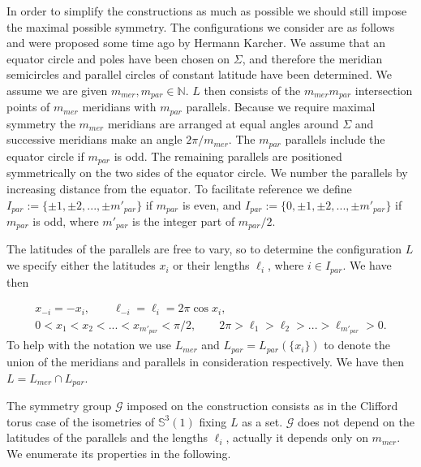 \documentclass[12pt,namelimits,sumlimits]{amsart}
\theoremstyle{remark}
\numberwithin{equation}{section}
\begin{document}
In order to simplify the constructions as much as possible we should still impose the maximal possible symmetry.
The configurations we consider are as follows and were proposed some time ago by Hermann Karcher.
We assume that an equator circle and poles have been chosen on $\Sigma$,
and therefore the meridian semicircles and parallel circles of constant latitude have been determined.
We assume we are given ${{m_{mer}}},{{m_{par}}}\in{\mathbb{N}}$.
$L$ then consists of the ${{m_{mer}}}{{m_{par}}}$ intersection points
of ${{m_{mer}}}$ meridians with ${{m_{par}}}$ parallels.
Because we require maximal symmetry the ${{m_{mer}}}$ meridians are arranged at equal angles around $\Sigma$
and successive meridians make an angle $2\pi/{{m_{mer}}}$.
The ${{m_{par}}}$ parallels include the equator circle if ${{m_{par}}}$ is odd.
The remaining parallels are positioned symmetrically on the two sides of the equator circle.
We number the parallels by increasing distance from the equator.
To facilitate reference we define ${{I_{par}}}:=\{\pm1,\pm2,...,\pm{{m'_{par}}}\}$ if ${{m_{par}}}$ is even,
and ${{I_{par}}}:=\{0,\pm1,\pm2,...,\pm{{m'_{par}}}\}$ if ${{m_{par}}}$ is odd,
where ${{m'_{par}}}$ is the integer part of ${{m_{par}}}/2$.

The latitudes of the parallels are free to vary,
so to determine the configuration $L$ we specify
either the latitudes $x_i$ or their lengths $\ell_i$,
where $i\in{{I_{par}}}$.
We have then
\addtocounter{theorem}{1}
\begin{equation}
\label{Elengths}
\begin{gathered}
x_{-i}=-x_i,
\qquad
\ell_{-i}=\ell_i
=2\pi\cos x_i,
\\
0<x_1<x_2< ... < x_{{m'_{par}}} <\pi/2,
\qquad
2\pi>\ell_1>\ell_2> ... > \ell_{{m'_{par}}} >0.
\end{gathered}
\end{equation}
To help with the notation we use ${{L_{mer}}}$ and ${{L_{par}}}={{L_{par}}}(\{x_i\})$ to denote
the union of the meridians and parallels in consideration respectively.
We have then $L={{L_{mer}}}\cap{{L_{par}}}$.

The symmetry group ${{\mathscr{G}}}$ imposed on the construction consists as in the Clifford torus case
of the isometries of ${\mathbb{S}}^3(1)$ fixing $L$ as a set.
${{\mathscr{G}}}$ does not depend on the latitudes of the parallels and the lengths $\ell_i$,
actually it depends only on ${{m_{mer}}}$.
We enumerate its properties in the following.
\end{document}
